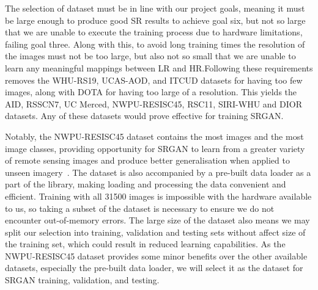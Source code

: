 The selection of dataset must be in line with our project goals, meaning it must be large enough to produce good SR results to achieve goal six, but not so large that we are unable to execute the training process due to hardware limitations, failing goal three. Along with this, to avoid long training times the resolution of the images must not be too large, but also not so small that we are unable to learn any meaningful mappings between LR and HR.\@  Following these requirements removes the WHU-RS19, UCAS-AOD, and ITCUD datasets for having too few images, along with DOTA for having too large of a resolution. This yields the AID, RSSCN7, UC Merced, NWPU-RESISC45, RSC11, SIRI-WHU and DIOR datasets. Any of these datasets would prove effective for training SRGAN.

Notably, the NWPU-RESISC45 dataset contains the most images and the most image classes, providing opportunity for SRGAN to learn from a greater variety of remote sensing images and produce better generalisation when applied to unseen imagery~\cite{resisc45}. The dataset is also accompanied by a pre-built data loader as a part of the   library, making loading and processing the data convenient and efficient. Training with all 31500 images is impossible with the hardware available to us, so taking a subset of the dataset is necessary to ensure we do not encounter out-of-memory errors. The large size of the dataset also means we may split our selection into training, validation and testing sets without affect size of the training set, which could result in reduced learning capabilities. As the NWPU-RESISC45 dataset provides some minor benefits over the other available datasets, especially the pre-built data loader, we will select it as the dataset for SRGAN training, validation, and testing. 

